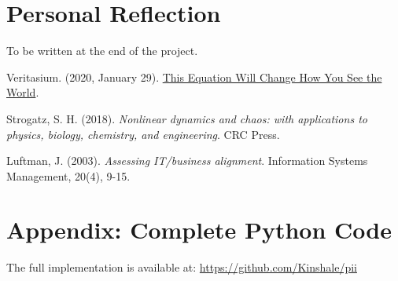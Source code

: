 \documentclass[a4paper, 10pt]{article}
\begin{document}
\clearpage

\section{Personal Reflection}
To be written at the end of the project. 

\begin{thebibliography}{9}
    Veritasium. (2020, January 29). \href{https://www.veritasium.com/videos/2020/1/29/this-equation-will-change-how-you-see-the-world}{This Equation Will Change How You See the World}.

	Strogatz, S. H. (2018). \textit{Nonlinear dynamics and chaos: with applications to physics, biology, chemistry, and engineering}. CRC Press.

	Luftman, J. (2003). \textit{Assessing IT/business alignment}. Information Systems Management, 20(4), 9-15.
\end{thebibliography}

\appendix
\section{Appendix: Complete Python Code}
The full implementation is available at: \url{https://github.com/Kinshale/pii}
\end{document}
